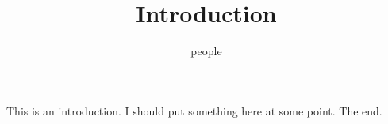 \documentclass[handout]{ximera}
\title{Introduction}
\author{people}
\begin{document}
\maketitle
This is an introduction. I should put something here at some point. The end.
\end{document}
